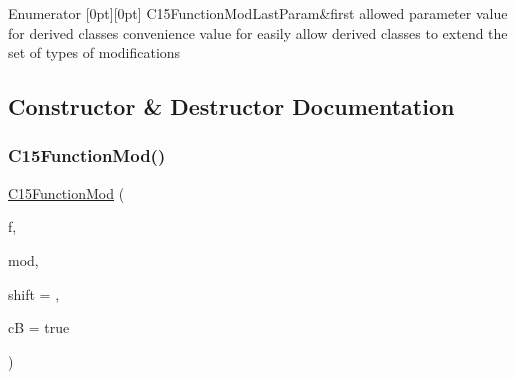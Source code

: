 \begin{DoxyEnumFields}{Enumerator}
[0pt][0pt]{}\mbox{\label{class_s_m_spp__di__unipi__it_1_1_c15_function_mod_afa67a9e3434632b6b9a0c393b08e0936a2009c699706c37b52089444390364b8a}} 
C15\+Function\+Mod\+Last\+Param&first allowed parameter value for derived classes convenience value for easily allow derived classes to extend the set of types of modifications \\
\hline

\end{DoxyEnumFields}


\subsection{Constructor \& Destructor Documentation}
\mbox{\label{class_s_m_spp__di__unipi__it_1_1_c15_function_mod_a602d9b4f2118ac9630069a11808fadbe}} 
\subsubsection{\texorpdfstring{C15\+Function\+Mod()}{C15FunctionMod()}}
{\footnotesize\ttfamily \mbox{\hyperlink{class_s_m_spp__di__unipi__it_1_1_c15_function_mod}{C15\+Function\+Mod}} (\begin{DoxyParamCaption}\item[{\mbox{\hyperlink{class_s_m_spp__di__unipi__it_1_1_c15_function}{C15\+Function}} $\ast$const}]{f,  }\item[{const int}]{mod,  }\item[{\mbox{\hyperlink{class_s_m_spp__di__unipi__it_1_1_function_a9ad432406b609e28d340f73e9474bffe}{Function\+::\+Function\+Value}}}]{shift = {},  }\item[{const bool}]{cB = {\ttfamily true} }\end{DoxyParamCaption})\hspace{0.3cm}{\ttfamily [inline]}}



